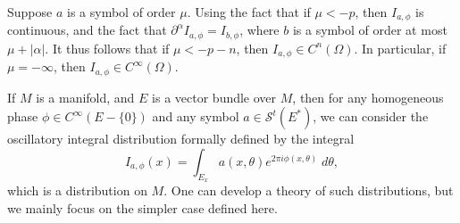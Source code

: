 %
%
%
%
%

\begin{remark}
	Suppose $a$ is a symbol of order $\mu$. Using the fact that if $\mu < -p$, then $I_{a,\phi}$ is continuous, and the fact that $\partial^\alpha I_{a,\phi} = I_{b,\phi}$, where $b$ is a symbol of order at most $\mu + |\alpha|$. It thus follows that if $\mu < -p-n$, then $I_{a,\phi} \in C^n(\Omega)$. In particular, if $\mu = -\infty$, then $I_{a,\phi} \in C^\infty(\Omega)$.
\end{remark}

\begin{remark}
    If $M$ is a manifold, and $E$ is a vector bundle over $M$, then for any homogeneous phase $\phi \in C^\infty(E - \{ 0 \})$ and any symbol $a \in \mathcal{S}^t(E^*)$, we can consider the oscillatory integral distribution formally defined by the integral
    \[ I_{a,\phi}(x) = \int_{E_x} a(x,\theta) e^{2 \pi i \phi(x,\theta)}\; d\theta, \]
    which is a distribution on $M$. One can develop a theory of such distributions, but we mainly focus on the simpler case defined here.
\end{remark}

